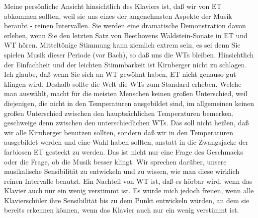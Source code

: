 Meine persönliche Ansicht hinsichtlich des Klaviers ist, daß wir von ET abkommen sollten, weil sie uns eines der angenehmsten Aspekte der Musik beraubt - reinen Intervallen.
Sie werden eine dramatische Demonstration davon erleben, wenn Sie den letzten Satz von Beethovens Waldstein-Sonate in ET und WT hören.
Mitteltönige Stimmung kann ziemlich extrem sein, es sei denn Sie spielen Musik dieser Periode (vor Bach), so daß uns die WTs bleiben.
Hinsichtlich der Einfachheit und der leichten Stimmbarkeit ist Kirnberger nicht zu schlagen.
Ich glaube, daß wenn Sie sich an WT gewöhnt haben, ET nicht genauso gut klingen wird.
Deshalb sollte die Welt die WTs zum Standard erheben.
Welche man auswählt, macht für die meisten Menschen keinen großen Unterschied, weil diejenigen, die nicht in den Temperaturen ausgebildet sind, im allgemeinen keinen großen Unterschied zwischen den hauptsächlichen Temperaturen bemerken, geschweige denn zwischen den unterschiedlichen WTs.
Das soll nicht heißen, daß wir alle Kirnberger benutzen sollten, sondern daß wir in den Temperaturen ausgebildet werden und eine Wahl haben sollten, anstatt in die Zwangsjacke der farblosen ET gesteckt zu werden.
Das ist nicht nur eine Frage des Geschmacks oder die Frage, ob die Musik besser klingt.
Wir sprechen darüber, unsere musikalische Sensibilität zu entwickeln und zu wissen, wie man diese wirklich reinen Intervalle benutzt.
Ein Nachteil von WT ist, daß es hörbar wird, wenn das Klavier auch nur ein wenig verstimmt ist.
Es würde mich jedoch freuen, wenn alle Klavierschüler ihre Sensibilität bis zu dem Punkt entwickeln würden, an dem sie bereits erkennen können, wenn das Klavier auch nur ein wenig verstimmt ist.



